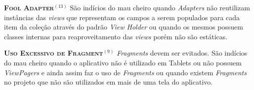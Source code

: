   \noindent
  \textsc{\textbf{{\small Fool Adapter}}}$^{(13)}$ São indícios do mau cheiro quando \textit{Adapters} não reutilizam instâncias das \textit{views} que representam os campos a serem populados para cada item da coleção através do padrão \textit{View Holder} ou quando os mesmos possuem classes internas para reaproveitamento das \textit{views} porém não são estáticas.






  \noindent
  \textsc{\textbf{{\small Uso Excessivo de Fragment}}}$^{(9)}$ \textit{Fragments} devem ser evitados. São indícios do mau cheiro quando o aplicativo não é utilizado em Tablets ou não possuem \textit{ViewPagers} e ainda assim faz o uso de \textit{Fragments} ou quando existem \textit{Fragments} no projeto que não são utilizados em mais de uma tela do aplicativo.



